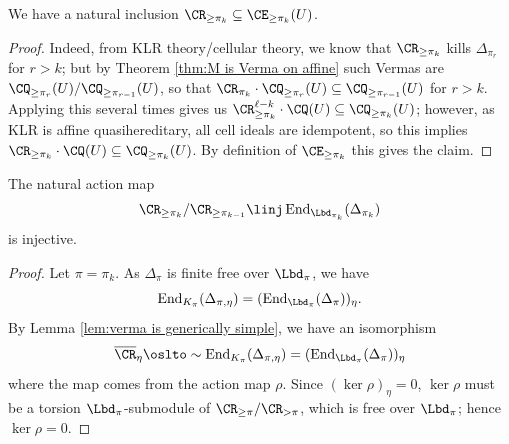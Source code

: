 \documentclass[11pt,reqno]{amsart}
\begin{document}
\begin{claim}\label{claim:cellular E 2}
    We have a natural inclusion $\CR_{\ge\pi_k}\subseteq \CE_{\ge\pi_k}(U)$.
\end{claim}
    \begin{proof}
    Indeed, from KLR theory/cellular theory, we know that $\CR_{\ge\pi_k}$ kills $\Delta_{\pi_r}$ for $r>k$; but by Theorem \ref{thm:M is Verma on affine} such Vermas are $\CQ_{\ge\pi_r}(U)/\CQ_{\ge\pi_{r-1}}(U)$, so that $\CR_{\pi_k}\cdot\CQ_{\ge\pi_r}(U)\subseteq\CQ_{\ge\pi_{r-1}}(U)$ for $r>k$. Applying this several times gives us $\CR_{\ge\pi_k}^{\ell-k}\cdot \CQ (U)\subseteq\CQ_{\ge\pi_k}(U)$; however, as KLR is affine quasihereditary, all cell ideals are idempotent, so this implies $\CR_{\ge\pi_k}\cdot \CQ (U)\subseteq\CQ_{\ge\pi_k}(U)$. By definition of $\CE_{\ge\pi_k}$ this gives the claim.
\end{proof}

\begin{claim}\label{claim:cellular E 3}
    The natural action map $$\CR_{\ge\pi_k}/\CR_{\ge\pi_{k-1}}\linj \End_{\Lbd_{\pi_k}}(\Delta_{\pi_k})$$ is injective.
\end{claim}
\begin{proof}
    Let $\pi=\pi_k$. As $\Delta_\pi$ is finite free over $\Lbd_\pi$, we have
    \[\End_{K_\pi}(\Delta_{\pi,\eta})=(\End_{\Lbd_\pi}(\Delta_\pi))_\eta.\] 
    By Lemma \ref{lem:verma is generically simple}, we have an isomorphism 
    \[\ol\CR_\eta\simlto \End_{K_\pi}(\Delta_{\pi,\eta})=(\End_{\Lbd_\pi}(\Delta_\pi))_\eta\] 
    where the map comes from the action map $\rho$. Since $(\ker\rho)_\eta=0$, $\ker\rho$ must be a torsion $\Lbd_\pi$-submodule of $\CR_{\ge\pi}/\CR_{>\pi}$, which is free over $\Lbd_\pi$; hence $\ker\rho=0$. 
\end{proof}
\end{document}
